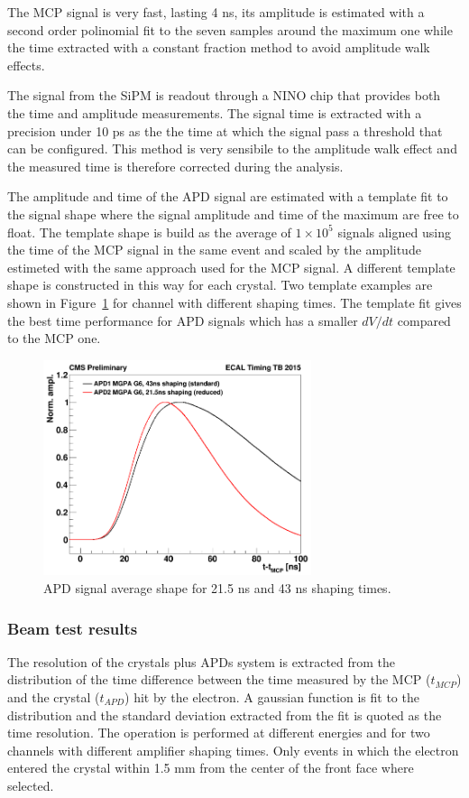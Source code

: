 The MCP signal is very fast, lasting 4 ns, its amplitude is estimated with a second order polinomial fit to the seven samples
around the maximum one while the time extracted with a constant fraction method to avoid amplitude walk effects.

The signal from the SiPM is readout through a NINO chip that provides both the time and amplitude measurements.
The signal time is extracted with a precision under 10 ps as the the time at which the signal pass a threshold that
can be configured. This method is very sensibile to the amplitude walk effect and the measured time is therefore
corrected during the analysis.

The amplitude and time of the APD signal are estimated with a template fit to the signal shape where the signal
amplitude and time of the maximum are free to float.
The template shape is build as the average of $1\times 10^5$ signals aligned using the time of the MCP signal
in the same event and scaled by the amplitude estimeted with the same approach used for the MCP signal.
A different template shape is constructed in this way
for each crystal. Two template examples are shown in Figure~\ref{fig:apd_templates} for channel with different  
shaping times. The template fit gives the best time performance for APD signals which has a smaller $dV/dt$ compared
to the MCP one.

\begin{figure}
  \centering
  \includegraphics[width = 0.7\textwidth]{figures/upgrade/wf_shaping_times.png}
  \caption{APD signal average shape for 21.5 ns and 43 ns shaping times.}
  \label{fig:apd_templates}
\end{figure}

\subsubsection{Beam test results}
The resolution of the \PbWO crystals plus APDs system is extracted from 
the distribution of the time difference between the time measured by the MCP ($t_{MCP}$) and the crystal ($t_{APD}$)
hit by the electron.
A gaussian function is fit to the distribution and the standard deviation extracted from the fit is quoted as
the time resolution. The operation is performed at different energies and for two channels with different
amplifier shaping times. Only events in which the electron entered the crystal within 1.5 mm from the center of the
front face where selected. 

